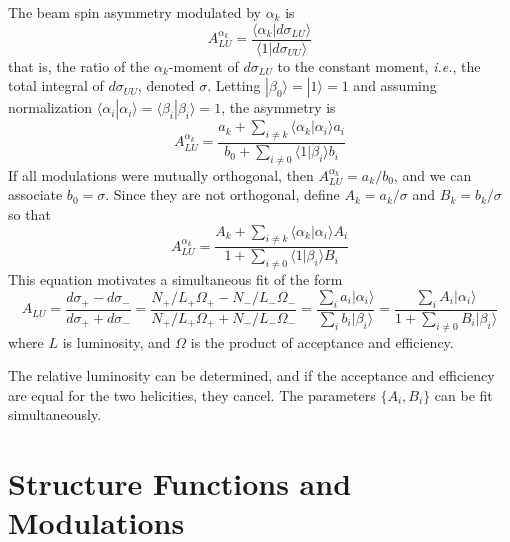 \documentclass[12pt]{article}
\begin{document}
The beam spin asymmetry modulated by $\alpha_k$ is
\begin{equation}
\displaystyle
A_{LU}^{\alpha_k}=\frac{\langle\alpha_k|d\sigma_{LU}\rangle}
                  {\langle1|d\sigma_{UU}\rangle}
\end{equation}
that is, the ratio of the $\alpha_k$-moment of $d\sigma_{LU}$ to the
constant moment, {\it i.e.}, the total integral of $d\sigma_{UU}$, denoted
$\sigma$. Letting $|\beta_0\rangle=|1\rangle=1$ and assuming normalization
$\langle\alpha_i|\alpha_i\rangle=\langle\beta_i|\beta_i\rangle=1$, the asymmetry is 
\begin{equation}
A_{LU}^{\alpha_k}=\dfrac
{ a_k+\sum_{i\neq k}{\langle \alpha_k|\alpha_i\rangle a_i} }
{ b_0+\sum_{i\neq 0}{\langle 1|\beta_i\rangle b_i} }
\end{equation}
If all modulations were mutually orthogonal, then $A_{LU}^{\alpha_k}=a_k/b_0$,
and we can associate $b_0=\sigma$. Since they are not orthogonal, define
$A_k=a_k/\sigma$ and $B_k=b_k/\sigma$ so that
\begin{equation}
A_{LU}^{\alpha_k}=\dfrac
{ A_k+\sum_{i\neq k}{\langle \alpha_k|\alpha_i\rangle A_i} }
{ 1+\sum_{i\neq 0}{\langle 1|\beta_i\rangle B_i} }
\end{equation}
This equation motivates a simultaneous fit of the form
\begin{equation}
A_{LU}=
\dfrac{d\sigma_+-d\sigma_-}{d\sigma_++d\sigma_-}=
\dfrac{N_+/L_+\Omega_+-N_-/L_-\Omega_-}
      {N_+/L_+\Omega_++N_-/L_-\Omega_-}=
\dfrac{\sum_i{a_i|\alpha_i\rangle}}
      {\sum_i{b_i|\beta_i\rangle}}=
\dfrac{\sum_i{A_i|\alpha_i\rangle}}
      {1+\sum_{i\neq 0}{B_i|\beta_i\rangle}}
      \end{equation}
where $L$ is luminosity, and $\Omega$ is the product of acceptance and
efficiency.

The relative luminosity can be determined, and if the acceptance and
efficiency are equal for the two helicities, they cancel. The parameters
$\{A_i,B_i\}$ can be fit simultaneously.


\section*{Structure Functions and Modulations}
\end{document}
